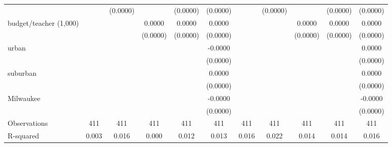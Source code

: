 {\begin{tabular}{l*{10}{c}}
                    &                     &    (0.0000)         &                     &    (0.0000)         &    (0.0000)         &                     &    (0.0000)         &                     &    (0.0000)         &    (0.0000)         \\
[1em]
budget/teacher (1,000)&                     &                     &      0.0000         &      0.0000         &      0.0000         &                     &                     &      0.0000         &      0.0000         &      0.0000         \\
                    &                     &                     &    (0.0000)         &    (0.0000)         &    (0.0000)         &                     &                     &    (0.0000)         &    (0.0000)         &    (0.0000)         \\
[1em]
urban               &                     &                     &                     &                     &     -0.0000         &                     &                     &                     &                     &      0.0000         \\
                    &                     &                     &                     &                     &    (0.0000)         &                     &                     &                     &                     &    (0.0000)         \\
[1em]
suburban            &                     &                     &                     &                     &      0.0000         &                     &                     &                     &                     &      0.0000         \\
                    &                     &                     &                     &                     &    (0.0000)         &                     &                     &                     &                     &    (0.0000)         \\
[1em]
Milwaukee           &                     &                     &                     &                     &     -0.0000         &                     &                     &                     &                     &     -0.0000\sym{**} \\
                    &                     &                     &                     &                     &    (0.0000)         &                     &                     &                     &                     &    (0.0000)         \\
\hline
Observations        &         411         &         411         &         411         &         411         &         411         &         411         &         411         &         411         &         411         &         411         \\
R-squared           &       0.003         &       0.016         &       0.000         &       0.012         &       0.013         &       0.016         &       0.022         &       0.014         &       0.014         &       0.016         \\
\hline\hline
\end{tabular}
}

